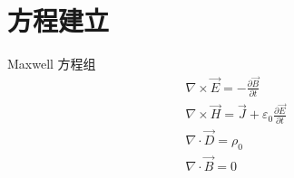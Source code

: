 \chapter{方程建立}

\begin{theorem}{Maxwell 方程组}
    \begin{gather}
        \nabla\times \vec{E}=-\frac{\partial \vec{B}}{\partial t}\\
        \nabla\times \vec{H}=\vec{J} +\varepsilon_0\frac{\partial \vec{E}}{\partial t}\\
        \nabla\cdot \vec{D}=\rho_0\\
        \nabla\cdot \vec{B}=0
    \end{gather}
\end{theorem}